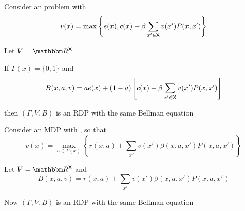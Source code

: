\documentclass[dvipsnames]{beamer}
\begin{document}
\begin{frame}
    

    \Eg Consider an  problem with 
    \begin{equation*}
            v(x) = \max
            \left\{
                e(x), c(x) + \beta \sum_{x' \in \mathsf X} v(x') P(x, x')
            \right\}
    \end{equation*}

    \vspace{0.5em}
    \vspace{0.5em}
    Let $V = \RR^\Xsf$

    \vspace{0.5em}
    If $\Gamma(x) = \{0, 1\}$ and
    \begin{equation*}
        B(x, a, v) = a e(x) + 
            (1-a) \left[
                c(x) + \beta \sum_{x' \in \mathsf X} v(x') P(x, x')
            \right]
    \end{equation*}
    
    then $(\Gamma, V, B)$ is an RDP with the same Bellman equation

\end{frame}


\begin{frame}
    
    \Eg Consider an MDP with , so that
    \begin{equation*}
            v(x)
            = \max_{a \in \Gamma(x)}
            \left\{
                r(x, a)
                + 
                \sum_{x'} v(x') \beta(x,a,x') P(x, a, x')
            \right\}
    \end{equation*}

    \vspace{0.5em}
    \vspace{0.5em}
    Let $V = \RR^\Xsf$ and
    \begin{equation*}
        B(x, a, v) 
        = r(x, a) + \sum_{x'} v(x') \beta(x, a, x') P(x, a, x')
    \end{equation*}

    \vspace{0.5em}
    Now $(\Gamma, V, B)$ is an RDP with the same Bellman equation

\end{frame}
\end{document}
